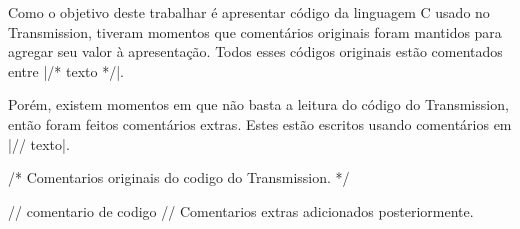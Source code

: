 Como o objetivo deste trabalhar é apresentar código da linguagem C usado no
Transmission, tiveram momentos que comentários originais foram mantidos para agregar seu
valor à apresentação. Todos esses códigos originais estão comentados entre
\sverb|/* texto */|.

Porém, existem momentos em que não basta a leitura do código do Transmission, então
foram feitos comentários extras. Estes estão escritos usando comentários em
\sverb|// texto|.

\begin{ccode}
    /* Comentarios originais do codigo do Transmission. */

    // comentario de codigo
    // Comentarios extras adicionados posteriormente.
\end{ccode}

\afterpage{\clearpage}